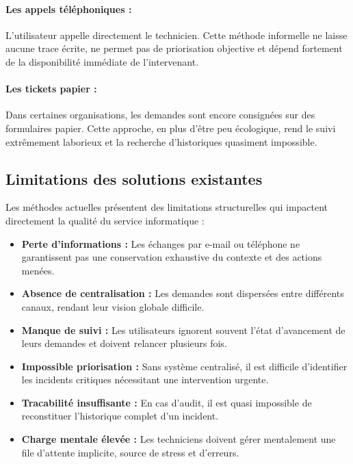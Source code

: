 \documentclass[12pt,a4paper,twoside]{report}
\begin{document}
\paragraph{Les appels téléphoniques :}
L'utilisateur appelle directement le technicien. Cette méthode informelle ne laisse aucune trace écrite, ne permet pas de priorisation objective et dépend fortement de la disponibilité immédiate de l'intervenant.

\paragraph{Les tickets papier :}
Dans certaines organisations, les demandes sont encore consignées sur des formulaires papier. Cette approche, en plus d'être peu écologique, rend le suivi extrêmement laborieux et la recherche d'historiques quasiment impossible.

\subsection{Limitations des solutions existantes}

Les méthodes actuelles présentent des limitations structurelles qui impactent directement la qualité du service informatique :

\begin{itemize}
    \item \textbf{Perte d'informations :} Les échanges par e-mail ou téléphone ne garantissent pas une conservation exhaustive du contexte et des actions menées.
    \item \textbf{Absence de centralisation :} Les demandes sont dispersées entre différents canaux, rendant leur vision globale difficile.
    \item \textbf{Manque de suivi :} Les utilisateurs ignorent souvent l'état d'avancement de leurs demandes et doivent relancer plusieurs fois.
    \item \textbf{Impossible priorisation :} Sans système centralisé, il est difficile d'identifier les incidents critiques nécessitant une intervention urgente.
    \item \textbf{Tracabilité insuffisante :} En cas d'audit, il est quasi impossible de reconstituer l'historique complet d'un incident.
    \item \textbf{Charge mentale élevée :} Les techniciens doivent gérer mentalement une file d'attente implicite, source de stress et d'erreurs.
\end{itemize}
\end{document}

